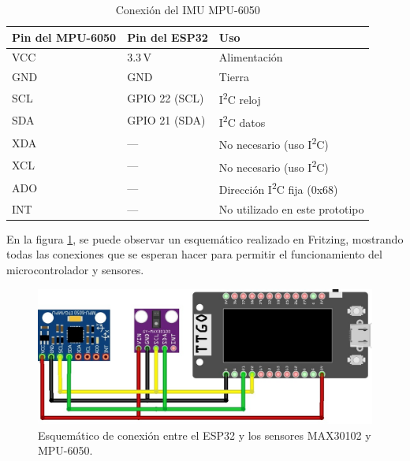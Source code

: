 \documentclass[12pt, a4paper]{article}
\begin{document}
	
	\begin{table}[ht]
		\centering
		\caption{Conexión del IMU MPU-6050}
		\label{tab:conexion_mpu6050}
		\begin{tabular}{|p{3.5cm}|p{3cm}|p{5cm}|}
			\hline
			\textbf{Pin del MPU-6050} & \textbf{Pin del ESP32}      & \textbf{Uso}                            \\ \hline
			VCC                        & 3.3\,V                       & Alimentación                                  \\ \hline
			GND                        & GND                          & Tierra                                           \\ \hline
			SCL                        & GPIO 22 (SCL)                & I\textsuperscript{2}C reloj                    \\ \hline
			SDA                        & GPIO 21 (SDA)                & I\textsuperscript{2}C datos                    \\ \hline
			XDA                        & —                            & No necesario (uso I\textsuperscript{2}C)        \\ \hline
			XCL                        & —                            & No necesario (uso I\textsuperscript{2}C)        \\ \hline
			ADO                        & —                            & Dirección I\textsuperscript{2}C fija (0x68)     \\ \hline
			INT                        & —                            & No utilizado en este prototipo                \\ \hline
		\end{tabular}
	\end{table}
	
	
	En la figura \ref{fig:esquema_prototipo}, se puede observar un esquemático realizado en Fritzing, mostrando todas las conexiones que se esperan hacer para permitir el funcionamiento del microcontrolador y sensores.
	\begin{figure}[htbp]
		\centering
		\includegraphics[width=\textwidth]{images/esquema_prototipo.jpg}
		\caption[Esquemático del prototipo]{Esquemático de conexión entre el ESP32 y los sensores MAX30102 y MPU-6050.}
		\label{fig:esquema_prototipo}
	\end{figure}
	
\end{document}
